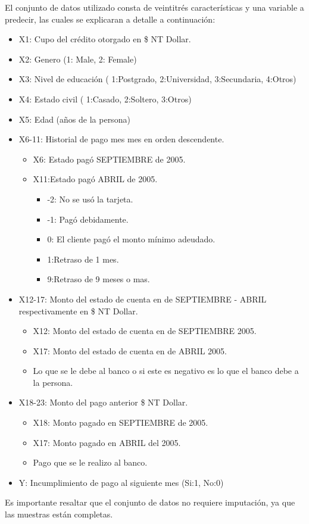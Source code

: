 \documentclass[conference]{IEEEtran}
\begin{document}
El conjunto de datos utilizado consta de veintitrés características y una variable a predecir, las cuales se explicaran a detalle a continuación: 
\\
\begin{itemize}
    \item X1: Cupo del crédito otorgado en \$ NT Dollar. 
    \item X2: Genero (1: Male, 2: Female)
    \item X3: Nivel de educación ( 1:Postgrado, 2:Universidad, 3:Secundaria, 4:Otros)
    \item X4: Estado civil ( 1:Casado, 2:Soltero, 3:Otros)
    \item X5: Edad (años de la persona)
    \item X6-11: Historial de pago mes  mes en orden descendente.
        \begin{itemize}
            \item X6: Estado pagó SEPTIEMBRE de 2005.
            \item X11:Estado pagó ABRIL de 2005.
             \begin{itemize}
                \item -2: No se usó la tarjeta.
                \item -1: Pagó debidamente.
                \item  0: El cliente pagó el monto mínimo adeudado.
                \item  1:Retraso de 1 mes.
                \item  9:Retraso de 9 meses o mas.
             \end{itemize}
         \end{itemize}
    \item X12-17: Monto del estado de cuenta en de SEPTIEMBRE - ABRIL respectivamente en \$ NT Dollar.
    \begin{itemize}
            \item X12: Monto del estado de cuenta en de SEPTIEMBRE 2005.
            \item X17: Monto del estado de cuenta en de ABRIL 2005.
            \item Lo que se le debe al banco o si este es negativo es lo que el banco debe a la persona.
         \end{itemize}
    \item X18-23: Monto del pago anterior \$ NT Dollar.
        \begin{itemize}
            \item X18: Monto pagado en SEPTIEMBRE de 2005.
            \item X17: Monto pagado en ABRIL del 2005.
            \item Pago que se le realizo al banco.
         \end{itemize}
    \item Y: Incumplimiento de pago al siguiente mes (Si:1, No:0)\\
\end{itemize}
Es importante resaltar que el conjunto de datos no requiere imputación, ya que las muestras están completas. 
\end{document}
